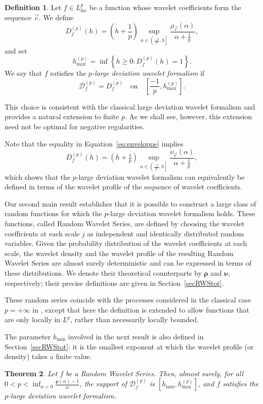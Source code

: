 \documentclass[a4paper,11pt,oneside]{article}
\newcommand{\ccint}[1]{\left[{#1}\right]}
\newcommand{\ocint}[1]{\left({#1}\right]}
\theoremstyle{definition}
\newtheorem{defi}{Definition}[section]
\theoremstyle{plain}
\newtheorem{thm}[defi]{Theorem}
\begin{document}
\begin{defi}
Let $f\in L^p_{\mathrm{loc}}$ be a function whose wavelet coefficients form the sequence $\vec{c}$. We define
\[
D^{(p)}_f(h) = \left(h+\frac{1}{p}\right)\sup_{\alpha\in\ocint{\frac{-1}{p},h}}\frac{\rho_{\vec{c}}(\alpha)}{\alpha+\frac{1}{p}},
\]
and set
\[
h^{(p)}_{\max}
=
\inf\left\{h\geq 0 : D_f^{(p)}(h)=1\right\}.
\]
We say that $f$ satisfies the \emph{$p$-large deviation wavelet formalism} if
\[
\mathscr{D}_f^{(p)} = D^{(p)}_f \quad \text{on} \quad \ccint{\frac{-1}{p},h^{(p)}_{\max}}.
\]
\end{defi}

 This choice is consistent with the classical large deviation wavelet formalism and provides a natural extension to finite $p$. As we shall see, however, this extension need not be optimal for negative regularities.


Note that the equality in Equation~\eqref{eq:enveloppe} implies
\[
D_f^{(p)}(h)=\left(h+\tfrac{1}{p}\right)\sup_{\alpha\in\ocint{\frac{-1}{p},h}}\frac{\nu_{\vec{c}}(\alpha)}{\alpha+\frac{1}{p}},
\]
which shows that the $p$-large deviation wavelet formalism can equivalently be defined in terms of the wavelet profile of the sequence of wavelet coefficients.  

Our second main result establishes that it is possible to construct a large class of random functions for which the $p$-large deviation wavelet formalism holds. These functions, called Random Wavelet Series, are defined by choosing the wavelet coefficients at each scale $j$ as independent and identically distributed random variables. Given the probability distribution of the wavelet coefficients at each scale, the wavelet density and the wavelet profile of the resulting Random Wavelet Series are almost surely deterministic and can be expressed in terms of these distributions. We denote their theoretical counterparts by $\bm{\rho}$ and $\bm{\nu}$, respectively; their precise definitions are given in Section~\ref{secRWStot}.

These random series coincide with the processes considered in the classical case $p=+\infty$ in \cite{RWS}, except that here the definition is extended to allow functions that are only locally in $L^p$, rather than necessarily locally bounded.


The parameter $h_{\min}$ involved in the next result is also defined in Section~\ref{secRWStot}: it is the smallest exponent at which the wavelet profile (or density) takes a finite value.

\begin{thm}\label{main_RWS}
Let $f$ be a Random Wavelet Series.
Then, almost surely, for all $0<p<\inf_{\alpha<0}\frac{\bm{\rho}(\alpha)-1}{\alpha}$, the support of $\mathscr{D}^{(p)}_f$ is $\ccint{h_{\min},h_{\max}^{(p)}}$, and $f$ satisfies the $p$-large deviation wavelet formalism.
\end{thm}
\end{document}
